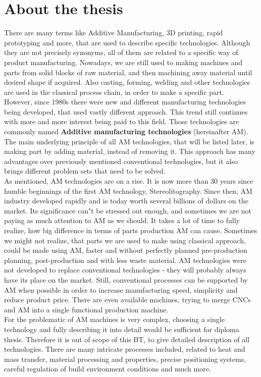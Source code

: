 \documentclass[a4paper, twoside, 11pt]{report}
\begin{document}
\section{About the thesis}
There are many terms like Additive Manufacturing, 3D printing, rapid prototyping and more, that are used to describe specific technologies. Although they are not precisely synonyms, all of them are related to a specific way of product manufacturing. Nowadays, we are still used to making machines and parts from solid blocks of raw material, and then machining away material until desired shape if acquired. Also casting, forming, welding and other technologies are used in the classical process chain, in order to make a specific part.\\
However, since 1980s there were new and different manufacturing technologies being developed, that used vastly different approach. This trend still continues with more and more interest being paid to this field. Those technologies are commonly named \textbf{Additive manufacturing technologies} (hereinafter AM). The main underlying principle of all AM technologies, that will be listed later, is making part by adding material, instead of removing it. This approach has many advantages over previously mentioned conventional technologies, but it also brings different problem sets that need to be solved.\\
As mentioned, AM technologies are on a rise. It is now more than 30 years since humble beginnings of the first AM technology, Stereolitography. Since then, AM industry developed rapidly and is today worth several billions of dollars on the market. Its significance can"t be stressed out enough, and sometimes we are not paying as much attention to AM as we should. It takes a lot of time to fully realize, how big difference in terms of parts production AM can cause. Sometimes we might not realize, that parts we are used to make using classical approach, could be made using AM, faster and without perfectly planned pre-production planning, post-production and with less waste material. AM technologies were not developed to replace conventional technologies - they will probably always have its place on the market. Still, conventional processes can be supported by AM when possible in order to increase manufacturing speed, simplicity and reduce product price. There are even available machines, trying to merge CNCs and AM into a single functional production machine.\\
For the problematic of AM machines is very complex, choosing a single technology and fully describing it into detail would be sufficient for diploma thesis. Therefore it is out of scope of this BT, to give detailed description of all technologies. There are many intricate processes included, related to heat and mass transfer, material processing and properties, precise positioning systems, careful regulation of build environment conditions and much more.\\
\end{document}
